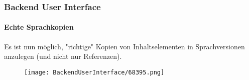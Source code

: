 \begin{frame}[fragile]
	\frametitle{Backend User Interface}
	\framesubtitle{Echte Sprachkopien}

	Es ist nun möglich, "richtige" Kopien von Inhaltselementen in Sprachversionen anzulegen
	(und nicht nur Referenzen).

	\begin{figure}
		\texttt{[image: BackendUserInterface/68395.png]}
	\end{figure}

\end{frame}


